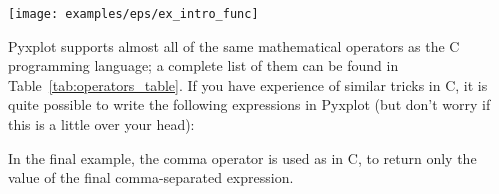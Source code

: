 \begin{center}
\texttt{[image: examples/eps/ex\_intro\_func]}
\end{center}

Pyxplot supports almost all of the same mathematical operators as the C
programming language; a complete list of them can be found in
Table~\ref{tab:operators_table}.
If you have experience of similar tricks in C, it is quite possible to write
the following expressions in Pyxplot (but don't worry if this is a little over
your head):

\vspace{3mm}

\vspace{3mm}

\noindent In the final example, the comma operator is used as in C, to return
only the value of the final comma-separated expression.

